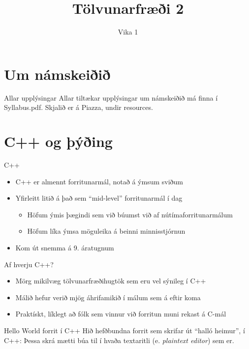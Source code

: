 \documentclass[handout]{beamer}
\title{Tölvunarfræði 2}
\subtitle{Vika 1}
\begin{document}
\begin{frame}
\titlepage
\end{frame}

\section{Um námskeiðið}

\begin{frame}{Allar upplýsingar}
Allar tiltækar upplýsingar um námskeiðið má finna í Syllabus.pdf. Skjalið er á Piazza, undir resources.
\end{frame}

\section{C++ og þýðing}

\begin{frame}{C++}
    \begin{itemize}
        \item C++ er almennt forritunarmál, notað á ýmsum sviðum
        \item Yfirleitt litið á það sem ``mid-level'' forritunarmál í dag
    \begin{itemize}
        \item Höfum ýmis þægindi sem við búumst við af nútímaforritunarmálum
        \item Höfum líka ýmsa möguleika á beinni minnisstjórnun
    \end{itemize}
        \item Kom út snemma á 9. áratugnum
    \end{itemize}
\end{frame}

\begin{frame}{Af hverju C++?}
    \begin{itemize}
        \item Mörg mikilvæg tölvunarfræðihugtök sem eru vel sýnileg í C++
        \item Málið hefur verið mjög áhrifamikið í málum sem á eftir koma
        \item Praktískt, líklegt að fólk sem vinnur við forritun muni rekast á C-mál
    \end{itemize}
\end{frame}


\begin{frame}[fragile]{Hello World forrit í C++}
    Hið hefðbundna forrit sem skrifar út ``halló heimur'', í C++:
    Þessa skrá mætti búa til í hvaða textaritli (e. \emph{plaintext editor}) sem er.
\end{frame}
\end{document}
